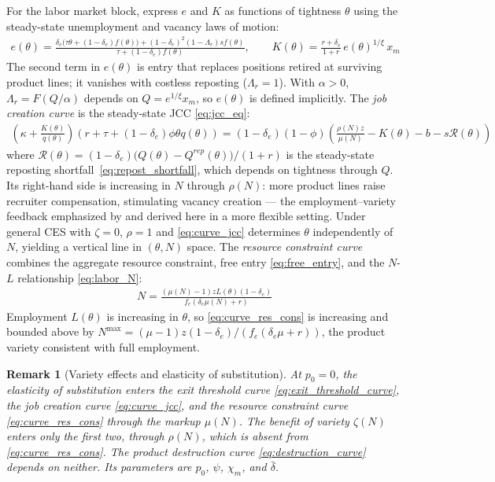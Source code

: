 \documentclass[authoryear, review, 12pt]{elsarticle}
\newtheorem{remark}{Remark}
\begin{document}
For the labor market block, express $e$ and $K$ as 
functions of tightness $\theta$ using the steady-state 
unemployment and vacancy laws of motion:
\begin{align}\label{eq:e_theta}
	e(\theta) =
	\frac{\delta_e\bigl(\tau\theta + (1-\delta_e)f(\theta)\bigr)
	+(1-\delta_e)^2(1-\Lambda_r)s f(\theta)}
	{\tau + (1-\delta_e)f(\theta)}, \qquad
	K(\theta) = \frac{r+\delta_e}{1+r}\,
	e(\theta)^{1/\xi}\,x_m
\end{align}
The second term in $e(\theta)$ is entry that replaces positions
retired at surviving product lines; it vanishes with costless
reposting ($\Lambda_r=1$). With $\alpha>0$, $\Lambda_r=F(Q/\alpha)$
depends on $Q=e^{1/\xi}x_m$, so $e(\theta)$ is defined implicitly.
The \emph{job creation curve} is the steady-state JCC
\eqref{eq:jcc_eq}:
\begin{align}\label{eq:curve_jcc}
	\left(\kappa+\frac{K(\theta)}{q(\theta)}\right)
	\left(r+\tau+(1-\delta_e)\phi\theta q(\theta)\right)
	= (1-\delta_e)(1-\phi)
	\left(\frac{\rho(N)z}{\mu(N)}-K(\theta)-b-s\mathcal{R}(\theta)\right)
\end{align}
where $\mathcal{R}(\theta)=(1-\delta_e)\bigl(Q(\theta)-Q^{rep}(\theta)\bigr)/(1+r)$
is the steady-state reposting shortfall~\eqref{eq:repost_shortfall},
which depends on tightness through $Q$.
Its right-hand side is increasing in $N$ through 
$\rho(N)$: more product lines raise recruiter 
compensation, stimulating vacancy creation --- the 
employment--variety feedback emphasized by 
\citet{schaal_2019} and derived here in a more 
flexible setting. Under general CES with $\zeta=0$, 
$\rho=1$ and \eqref{eq:curve_jcc} determines $\theta$ 
independently of $N$, yielding a vertical line in 
$(\theta,N)$ space. The \emph{resource constraint 
	curve} combines the aggregate resource constraint, 
free entry \eqref{eq:free_entry}, and the $N$-$L$ 
relationship \eqref{eq:labor_N}:
\begin{align}\label{eq:curve_res_cons}
	N = \frac{(\mu(N)-1)zL(\theta)(1-\delta_e)}
	{f_e(\delta_e\mu(N)+r)}
\end{align}
Employment $L(\theta)$ is increasing in $\theta$, so \eqref{eq:curve_res_cons} is
increasing and bounded above by
$N^{\max}=(\mu-1)z(1-\delta_e)/(f_e(\delta_e\mu+r))$,
the product variety consistent with full employment.

\begin{remark}[Variety effects and elasticity of substitution]\label{rem:curves}
	At $p_0=0$, the elasticity of substitution enters the exit threshold curve
	\eqref{eq:exit_threshold_curve}, the job creation curve \eqref{eq:curve_jcc}, and the
	resource constraint curve \eqref{eq:curve_res_cons} through the markup $\mu(N)$. The
	benefit of variety $\zeta(N)$ enters only the first two, through $\rho(N)$, which is
	absent from \eqref{eq:curve_res_cons}. The product destruction curve
	\eqref{eq:destruction_curve} depends on neither. Its parameters are $p_0$, $\psi$,
	$\chi_m$, and $\bar\delta$.
\end{remark}
\end{document}
